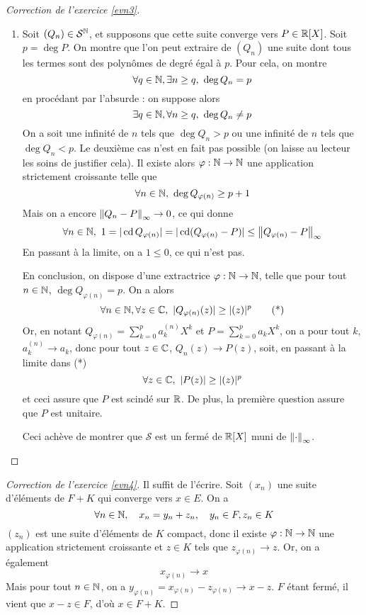 \begin{proof}[Correction de l'exercice \ref{evn3}]
\begin{enumerate}
        \item Soit $(Q_n)\in\mathcal S^{\operatorname{\mathbb N}}$, et supposons que cette suite converge vers $P\in\operatorname{\mathbb R}[X]$.
        Soit $p=\deg P$. 
        On montre que l'on peut extraire de $(Q_n)$ une suite dont tous les termes sont des polynômes de degré égal à $p$.
        Pour cela, on montre 
        \[
            \forall q\in\operatorname{\mathbb N}, \exists n\geq q,\ \deg Q_n=p    
        \]
        en procédant par l'absurde : on suppose alors 
        \[
            \exists q\in\operatorname{\mathbb N}, \forall n\geq q,\ \deg Q_n\neq p
        \]
        On a soit une infinité de $n$ tels que $\deg Q_n > p$ ou une infinité de $n$ tels que $\deg Q_n < p$. 
        Le deuxième cas n'est en fait pas possible (on laisse au lecteur les soins de justifier cela). 
        Il existe alors $\varphi : \operatorname{\mathbb N}\to\operatorname{\mathbb N}$ une application strictement croissante telle que 
        \[
            \forall n\in\operatorname{\mathbb N},\ \deg Q_{\varphi(n)}\geq p + 1
        \]
        Mais on a encore $\left\lVert Q_n-P\right\rVert_\infty\to 0$, ce qui donne 
        \[
            \forall n\in\operatorname{\mathbb N},\ 1=|\operatorname{cd} Q_{\varphi(n)}|=|\operatorname{cd}(Q_{\varphi(n)}-P)|\leq \left\lVert Q_{\varphi(n)}-P\right\rVert_\infty
        \]
        En passant à la limite, on a $1\leq 0$, ce qui n'est pas. 

        En conclusion, on dispose d'une extractrice $\varphi:\operatorname{\mathbb N}\to\operatorname{\mathbb N}$, telle que pour tout $n\in\operatorname{\mathbb N}$, $\deg Q_{\varphi(n)}=p$.
        On a alors 
        \[
            \forall n\in\N,\forall z\in\C,\ |Q_{\varphi(n)}(z)|\geq|\Im(z)|^p    \tag*{(*)}
        \]
        Or, en notant $Q_{\varphi(n)}=\sum_{k=0}^pa_k^{(n)}X^k$ et $P=\sum_{k=0}^pa_kX^k$, on a pour tout $k$, $a_k^{(n)}\to a_k$, donc pour tout $z\in\operatorname{\mathbb C}$, $Q_n(z)\to P(z)$,
        soit, en passant à la limite dans (*)
        \[
            \forall z\in\operatorname{\mathbb C},\ |P(z)|\geq|\relax(z)|^p
        \]
        et ceci assure que $P$ est scindé sur $\operatorname{\mathbb R}$. 
        De plus, la première question assure que $P$ est unitaire.
        
        Ceci achève de montrer que $\mathcal S$ est un fermé de $\operatorname{\mathbb R}[X]$ muni de $\left\lVert \cdot\right\rVert_\infty$.
    \end{enumerate}
\end{proof}

\begin{proof}[Correction de l'exercice \ref{evn4}]
	Il suffit de l'écrire. Soit $(x_n)$ une suite d'éléments de $F+K$ qui converge vers $x\in E$. 
    On a \[\forall n\in\operatorname{\mathbb N},\quad x_n=y_n+z_n,\quad y_n\in F,z_n\in K\]
	$(z_n)$ est une suite d'éléments de $K$ compact, donc il existe $\varphi :\operatorname{\mathbb N}\to \operatorname{\mathbb N}$ une application strictement croissante et $z\in K$ 
    tels que $z_{\varphi(n)}\longrightarrow z$. Or, on a également \[x_{\varphi(n)}\longrightarrow x\]
	Mais pour tout $n\in\operatorname{\mathbb N}$, on a $y_{\varphi(n)}=x_{\varphi(n)}-z_{\varphi(n)}\longrightarrow x-z$. 
    $F$ étant fermé, il vient que $x-z\in F$, d'où $x\in F+K$.
\end{proof}

